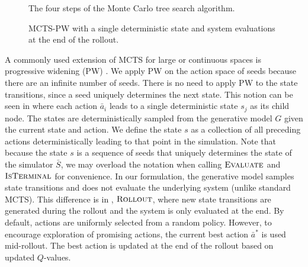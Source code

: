 \begin{figure*}[!t]
\centering
\resizebox{\textwidth}{!}{}
\caption{The four steps of the Monte Carlo tree search algorithm.}
\label{fig:mcts}
\end{figure*}

\begin{figure}[!b]
\centering
\resizebox{0.5\textwidth}{!}{}
\caption{MCTS-PW with a single deterministic state and system evaluations at the end of the rollout.}
\label{fig:mcts_pw}
\end{figure}
A commonly used extension of MCTS for large or continuous spaces is progressive widening (PW) \cite{chaslot2007progressive,mcts_ucb,ll_wildfire,mcts_wildfire}.
We apply PW on the action space of seeds because there are an infinite number of seeds.
There is no need to apply PW to the state transitions, since a seed uniquely determines the next state. 
This notion can be seen in  where each action $\bar{a}_i$ leads to a single deterministic state $s_j$ as its child node.
The states are deterministically sampled from the generative model $G$ given the current state and action.
We define the state $s$ as a collection of all preceding actions deterministically leading to that point in the simulation.
Note that because the state $s$ is a sequence of seeds that uniquely determines the state of the simulator $\bar{S}$, we may overload the notation when calling $\textsc{Evaluate}$ and $\textsc{IsTerminal}$ for convenience.
In our formulation, the generative model samples state transitions and does not evaluate the underlying system (unlike standard MCTS).
This difference is in , $\textsc{Rollout}$, where new state transitions are generated during the rollout and the system is only evaluated at the end.
By default, actions are uniformly selected from a random policy.
However, to encourage exploration of promising actions, the current best action $\bar{a}^*$ is used mid-rollout.
The best action is updated at the end of the rollout based on updated $Q$-values.


